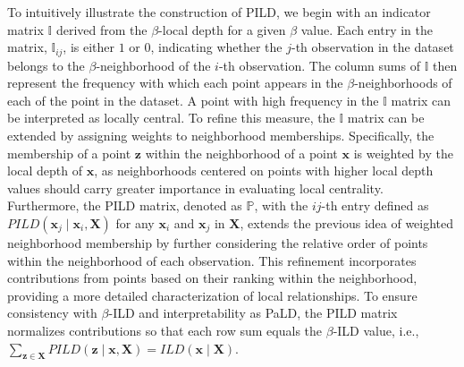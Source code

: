 \documentclass[final,3p,times]{elsarticle}
\newcommand{\vecx}{\mathbf{x}}
\newcommand{\vecX}{\mathbf{X}}
\newcommand{\vecz}{\mathbf{z}}
\begin{document}
To intuitively illustrate the construction of PILD, we begin with an indicator matrix $\mathbb{I}$ derived from the $\beta$-local depth for a given $\beta$ value. Each entry in the matrix, $\mathbb{I}_{ij}$, is either $1$ or $0$, indicating whether the $j$-th observation in the dataset belongs to the $\beta$-neighborhood of the $i$-th observation. The column sums of $\mathbb{I}$ then represent the frequency with which each point appears in the $\beta$-neighborhoods of each of the point in the dataset. A point with high frequency in the $\mathbb{I}$ matrix can be interpreted as locally central. To refine this measure, the $\mathbb{I}$ matrix can be extended by assigning weights to neighborhood memberships. Specifically, the membership of a point $\vecz$ within the neighborhood of a point $\vecx$ is weighted by the local depth of $\vecx$, as neighborhoods centered on points with higher local depth values should carry greater importance in evaluating local centrality. Furthermore, the PILD matrix, denoted as $\mathbb{P}$, with the $ij$-th entry defined as $PILD(\vecx_j \mid \vecx_i, \vecX)$ for any $\vecx_i$ and $\vecx_j$ in $\vecX$, extends the previous idea of weighted neighborhood membership by further considering the relative order of points within the neighborhood of each observation. This refinement incorporates contributions from points based on their ranking within the neighborhood, providing a more detailed characterization of local relationships. To ensure consistency with $\beta$-ILD and interpretability as PaLD, the PILD matrix normalizes contributions so that each row sum equals the $\beta$-ILD value, i.e., $\sum_{\vecz \in \vecX} PILD(\vecz \mid \vecx, \vecX) = ILD(\vecx \mid \vecX)$.
\end{document}
